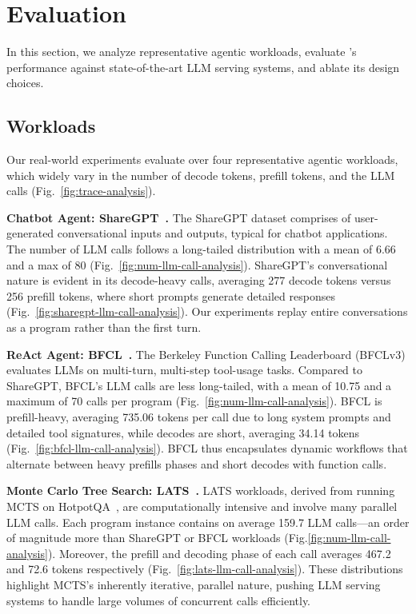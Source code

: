 \section{Evaluation}
\label{sec:evaluation}
In this section, we analyze representative agentic workloads, evaluate \text{\name}'s performance against state-of-the-art LLM serving systems, and ablate its design choices.

\subsection{Workloads}



Our real-world experiments evaluate \text{\name} over four representative agentic workloads, which widely vary in the number of decode tokens, prefill tokens, and the LLM calls (Fig.~\ref{fig:trace-analysis}).

\vspace{1mm}
\noindent \textbf{Chatbot Agent: ShareGPT~\cite{sharegpt}.} The ShareGPT dataset comprises of user-generated conversational inputs and outputs, typical for chatbot applications. The number of LLM calls follows a long-tailed distribution with a mean of 6.66 and a max of 80 (Fig.~\ref{fig:num-llm-call-analysis}). ShareGPT's conversational nature is evident in its decode-heavy calls, averaging 277 decode tokens versus 256 prefill tokens, where short prompts generate detailed responses (Fig.~\ref{fig:sharegpt-llm-call-analysis}). Our experiments replay entire conversations as a program rather than the first turn.

\vspace{1mm}
\noindent \textbf{ReAct Agent: BFCL~\cite{berkeley-function-calling-leaderboard}.}
The Berkeley Function Calling Leaderboard (BFCLv3) evaluates LLMs on multi-turn, multi-step tool-usage tasks.  Compared to ShareGPT, BFCL's LLM calls are less long-tailed, with a mean of 10.75 and a maximum of 70 calls per program (Fig.~\ref{fig:num-llm-call-analysis}). BFCL is prefill-heavy, averaging 735.06 tokens per call due to long system prompts and detailed tool signatures, while decodes are short, averaging 34.14 tokens (Fig.~\ref{fig:bfcl-llm-call-analysis}). BFCL thus encapsulates dynamic workflows that alternate between heavy prefills phases and short decodes with function calls.

\vspace{1mm}
\noindent \textbf{Monte Carlo Tree Search: LATS~\cite{zhou2024languageagenttreesearch}.} LATS workloads, derived from running MCTS on HotpotQA~\cite{yang2018hotpotqadatasetdiverseexplainable}, are computationally intensive and involve many parallel LLM calls. Each program instance contains on average 159.7 LLM calls—an order of magnitude more than ShareGPT or BFCL workloads (Fig.\ref{fig:num-llm-call-analysis}). Moreover, the prefill and decoding phase of each call averages 467.2 and 72.6 tokens respectively (Fig.~\ref{fig:lats-llm-call-analysis}). These distributions highlight MCTS’s inherently iterative, parallel nature, pushing LLM serving systems to handle large volumes of concurrent calls efficiently. 

